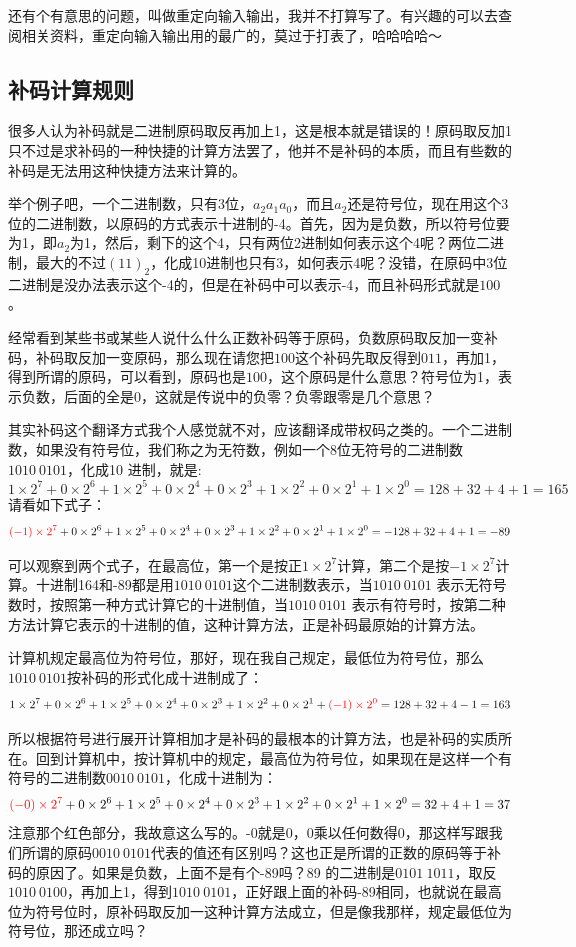 \documentclass[11pt,twoside,a4paper,titlepage]{article}	%
\begin{document}
还有个有意思的问题，叫做重定向输入输出，我并不打算写了。有兴趣的可以去查阅相关资料，重定向输入输出用的最广的，莫过于打表了，哈哈哈哈～

\subsection{补码计算规则}
很多人认为补码就是二进制原码取反再加上1，这是根本就是错误的！原码取反加1只不过是求补码的一种快捷的计算方法罢了，他并不是补码的本质，而且有些数的补码是无法用这种快捷方法来计算的。

举个例子吧，一个二进制数，只有3位，$a_2a_1a_0$，而且$a_2$还是符号位，现在用这个3位的二进制数，以原码的方式表示十进制的-4。首先，因为是负数，所以符号位要为1，即$a_2$为1，然后，剩下的这个4，只有两位2进制如何表示这个4呢？两位二进制，最大的不过$(11)_2$，化成10进制也只有3，如何表示4呢？没错，在原码中3位二进制是没办法表示这个-4的，但是在补码中可以表示-4，而且补码形式就是$100$。

经常看到某些书或某些人说什么什么正数补码等于原码，负数原码取反加一变补码，补码取反加一变原码，那么现在请您把$100$这个补码先取反得到$011$，再加1，得到所谓的原码，可以看到，原码也是$100$，这个原码是什么意思？符号位为1，表示负数，后面的全是0，这就是传说中的负零？负零跟零是几个意思？

其实补码这个翻译方式我个人感觉就不对，应该翻译成带权码之类的。一个二进制数，如果没有符号位，我们称之为无符数，例如一个8位无符号的二进制数$1010\ 0101$，化成10 进制，就是:
$$1\times 2^7 + 0\times 2^6 + 1\times 2^5 + 0\times 2^4 + 0\times 2^3 + 1\times 2^2 + 0\times 2^1  + 1\times 2^0 = 128+32+4+1 = 165$$
请看如下式子：
$$\textcolor[rgb]{1.0,.0,.0}{(-1)\times 2^7} + 0\times 2^6 + 1\times 2^5 + 0\times 2^4 + 0\times 2^3 + 1\times 2^2 + 0\times 2^1  + 1\times 2^0 = -128+32+4+1 = -89$$

可以观察到两个式子，在最高位，第一个是按正$1\times 2^7$计算，第二个是按$-1\times 2^7$计算。十进制164和-89都是用$1010\ 0101$这个二进制数表示，当$1010\ 0101$ 表示无符号数时，按照第一种方式计算它的十进制值，当$1010\ 0101$ 表示有符号时，按第二种方法计算它表示的十进制的值，这种计算方法，正是补码最原始的计算方法。

计算机规定最高位为符号位，那好，现在我自己规定，最低位为符号位，那么$1010\ 0101$按补码的形式化成十进制成了：
$$1\times 2^7 + 0\times 2^6 + 1\times 2^5 + 0\times 2^4 + 0\times 2^3 + 1\times 2^2 + 0\times 2^1  + \textcolor[rgb]{1.0,.0,.0}{(-1)\times 2^0} = 128+32+4-1 = 163$$

所以根据符号进行展开计算相加才是补码的最根本的计算方法，也是补码的实质所在。回到计算机中，按计算机中的规定，最高位为符号位，如果现在是这样一个有符号的二进制数$0010\ 0101$，化成十进制为：
$$\textcolor[rgb]{1.0,.0,.0}{(-0)\times 2^7} + 0\times 2^6 + 1\times 2^5 + 0\times 2^4 + 0\times 2^3 + 1\times 2^2 + 0\times 2^1  + 1\times 2^0 = 32+4+1 = 37$$
注意那个红色部分，我故意这么写的。-0就是0，0乘以任何数得0，那这样写跟我们所谓的原码$0010\ 0101$代表的值还有区别吗？这也正是所谓的正数的原码等于补码的原因了。如果是负数，上面不是有个-89吗？89 的二进制是$0101\ 1011$，取反$1010\ 0100$，再加上1，得到$1010\ 0101$，正好跟上面的补码-89相同，也就说在最高位为符号位时，原补码取反加一这种计算方法成立，但是像我那样，规定最低位为符号位，那还成立吗？
\end{document}
